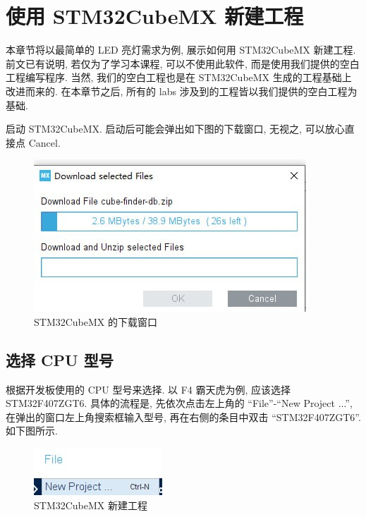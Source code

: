 \chapter{使用 STM32CubeMX 新建工程}
本章节将以最简单的 LED 亮灯需求为例, 展示如何用 STM32CubeMX 新建工程. 前文已有说明, 若仅为了学习本课程, 可以不使用此软件, 而是使用我们提供的空白工程编写程序. 当然, 我们的空白工程也是在 STM32CubeMX 生成的工程基础上改进而来的. 在本章节之后, 所有的 labs 涉及到的工程皆以我们提供的空白工程为基础.

启动 STM32CubeMX. 启动后可能会弹出如下图的下载窗口, 无视之, 可以放心直接点 Cancel.

\begin{figure}[H]
    \centering
    \includegraphics{images/1-newproj-down.jpg}
    \caption{STM32CubeMX 的下载窗口}
\end{figure}

\section{选择 CPU 型号}
根据开发板使用的 CPU 型号来选择. 以 F4 霸天虎为例, 应该选择 STM32F407ZGT6. 具体的流程是, 先依次点击左上角的 ``File''-``New Project ...'', 在弹出的窗口左上角搜索框输入型号, 再在右侧的条目中双击 ``STM32F407ZGT6''. 如下图所示.

\begin{figure}[H]
    \centering
    \includegraphics{images/1-newproj-new.jpg}
    \caption{STM32CubeMX 新建工程}
\end{figure}

